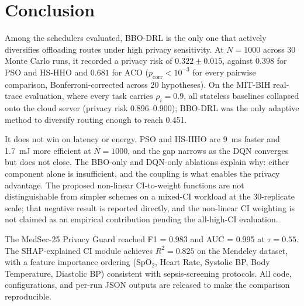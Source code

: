 \documentclass[journal]{IEEEtran}
\begin{document}
\section{Conclusion}
\label{sec:conclusion}

Among the schedulers evaluated, BBO-DRL is the only one that
actively diversifies offloading routes under high privacy sensitivity.
At $N = 1000$ across 30 Monte Carlo runs, it recorded a privacy risk
of $0.322 \pm 0.015$, against $0.398$ for PSO and HS-HHO and $0.681$
for ACO ($p_{\text{corr}} < 10^{-3}$ for every pairwise comparison,
Bonferroni-corrected across 20 hypotheses). On the MIT-BIH real-trace
evaluation, where every task carries $\rho_i = 0.9$, all stateless
baselines collapsed onto the cloud server (privacy risk 0.896--0.900);
BBO-DRL was the only adaptive method to diversify routing enough to
reach 0.451.

It does not win on latency or energy. PSO and HS-HHO are 9~ms faster
and 1.7~mJ more efficient at $N = 1000$, and the gap narrows as the
DQN converges but does not close. The BBO-only and DQN-only ablations
explain why: either component alone is insufficient, and the coupling
is what enables the privacy advantage. The proposed non-linear
CI-to-weight functions are not distinguishable from simpler schemes on
a mixed-CI workload at the 30-replicate scale; that negative result is
reported directly, and the non-linear CI weighting is not claimed as
an empirical contribution pending the all-high-CI evaluation.

The MedSec-25 Privacy Guard reached F1 = 0.983 and AUC = 0.995 at
$\tau = 0.55$. The SHAP-explained CI module achieves $R^2 = 0.825$ on
the Mendeley dataset, with a feature importance ordering (SpO$_2$,
Heart Rate, Systolic BP, Body Temperature, Diastolic BP) consistent
with sepsis-screening protocols. All code, configurations, and per-run
JSON outputs are released to make the comparison reproducible.
\end{document}
